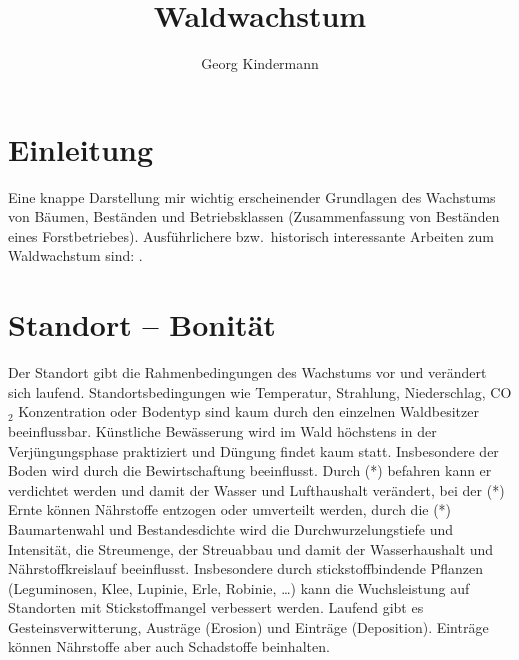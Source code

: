 \documentclass[twocolumn]{scrartcl}
\title{Waldwachstum}
\author{Georg Kindermann}
\begin{document}
\twocolumn[
  \begin{@twocolumnfalse}
    \maketitle
  \end{@twocolumnfalse}
]

\tableofcontents

\section{Einleitung}

Eine knappe Darstellung mir wichtig erscheinender Grundlagen des Wachstums von
Bäumen, Beständen und Betriebsklassen (Zusammenfassung von Beständen eines
Forstbetriebes). Ausführlichere bzw.\ historisch interessante Arbeiten zum
Waldwachstum sind:
\cite{guttenberg1885Wachstumsgesetze,guttenberg1912ZuwachslehreInHandbuchDerForstwissenschaft,vanselow1941Zuwachslehre,weck1948,wiedemann1951Ertragskunde,assmann1961Waldertraskunde,erteld1966Waldertragslehre,mitscherlich1975WaldWachstumUmwelt,kramer1988Waldwachstumslehre,wenk1990Waldertragslehre,Gadow1999Modelling,Gadov2003Waldstruktur,pretzsch2002Grundlagen,Pretzsch2003Modellierung,Vanclay2006,Weiskittel2011,Pretzsch2019}.

\section{Standort -- Bonität}

Der Standort gibt die Rahmenbedingungen des Wachstums vor und verändert sich
laufend. Standortsbedingungen wie Temperatur, Strahlung, Niederschlag, CO$_2$
Konzentration oder Bodentyp sind kaum durch den einzelnen Waldbesitzer
beeinflussbar. Künstliche Bewässerung wird im Wald höchstens in der
Verjüngungsphase praktiziert und Düngung findet kaum statt. Insbesondere der
Boden wird durch die Bewirtschaftung beeinflusst. Durch (*) befahren kann er
verdichtet werden und damit der Wasser und Lufthaushalt verändert, bei der (*)
Ernte können Nährstoffe entzogen oder umverteilt werden, durch die (*)
Baumartenwahl und Bestandesdichte wird die Durchwurzelungstiefe und Intensität,
die Streumenge, der Streuabbau und damit der Wasserhaushalt und
Nährstoffkreislauf beeinflusst. Insbesondere durch stickstoffbindende Pflanzen
(Leguminosen, Klee, Lupinie, Erle, Robinie, \dots) kann die Wuchsleistung auf
Standorten mit Stickstoffmangel verbessert werden. Laufend gibt es
Gesteinsverwitterung, Austräge (Erosion) und Einträge (Deposition). Einträge
können Nährstoffe aber auch Schadstoffe beinhalten.
\end{document}
